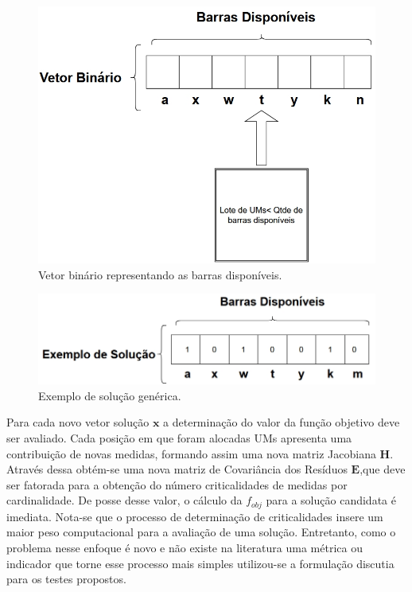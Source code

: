 \documentclass[12pt]{article}
\begin{document}
\begin{figure}[H]
	\centering 
	\includegraphics[scale=0.6]{figuras/vetor_bin.jpg}
	\caption{Vetor binário representando as barras disponíveis.}
	\label{fig6} %
\end{figure}

\begin{figure}[H]
	\centering 
	\includegraphics[scale=0.6]{figuras/exemplo_generico.jpg}
	\caption{Exemplo de solução genérica.}
	\label{fig7} %
\end{figure}

Para cada novo vetor solução $\mathbf{x}$ a determinação do valor da função objetivo deve ser avaliado. Cada posição em que foram alocadas UMs apresenta uma contribuição de novas medidas, formando assim uma nova matriz Jacobiana $\mathbf{H}$. Através dessa obtém-se uma nova matriz de Covariância dos Resíduos $\mathbf{E}$,que deve ser fatorada para a obtenção do número criticalidades de medidas por cardinalidade. De posse desse valor, o cálculo da $f_{obj}$ para a solução candidata é imediata. Nota-se que o processo de determinação de criticalidades insere um maior peso computacional para a avaliação de uma solução. Entretanto, como o problema nesse enfoque é novo e não existe na literatura uma métrica ou indicador que torne esse processo mais simples utilizou-se a formulação discutia para os testes propostos.
\end{document}
